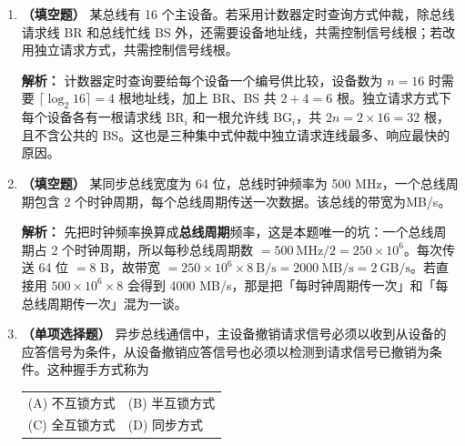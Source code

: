 \begin{enumerate}
\ifshowsolutions\par\noindent\textbf{解析：} 链式查询的 BG 信号像接力棒一样从仲裁器出发，按物理位置依次经过各设备，谁先接到谁先得到机会，因此优先级由\textbf{物理位置}固定，最近的最高。它只用 BR、BS、BG 三根线，代价是可靠性差：链路一断，后面的设备全部失联。(D) 描述的是\textbf{计数器定时查询}——那里才有一组设备地址线和可置初值的计数器，通过改变计数起点实现固定、循环或程序可控的优先级。链式查询没有计数器，无法用初值调优先级。\else \answerarea \fi

\item \textbf{（填空题）} 某总线有 16 个主设备。若采用计数器定时查询方式仲裁，除总线请求线 BR 和总线忙线 BS 外，还需要设备地址线，共需控制信号线\underline{\hspace{2cm}}根；若改用独立请求方式，共需控制信号线\underline{\hspace{2cm}}根。

\ifshowsolutions\par\noindent\textbf{解析：} 计数器定时查询要给每个设备一个编号供比较，设备数为 $n=16$ 时需要 $\lceil\log_2 16\rceil=4$ 根地址线，加上 BR、BS 共 $2+4=6$ 根。独立请求方式下每个设备各有一根请求线 BR$_i$ 和一根允许线 BG$_i$，共 $2n=2\times16=32$ 根，且不含公共的 BS。这也是三种集中式仲裁中独立请求连线最多、响应最快的原因。\else \answerarea \fi

\item \textbf{（填空题）} 某同步总线宽度为 64 位，总线时钟频率为 500 MHz，一个总线周期包含 2 个时钟周期，每个总线周期传送一次数据。该总线的带宽为\underline{\hspace{2cm}}MB/s。

\ifshowsolutions\par\noindent\textbf{解析：} 先把时钟频率换算成\textbf{总线周期}频率，这是本题唯一的坑：一个总线周期占 2 个时钟周期，所以每秒总线周期数 $=500\ \text{MHz}/2=250\times10^{6}$。每次传送 64 位 $=8$ B，故带宽 $=250\times10^{6}\times 8\ \text{B/s}=2000\ \text{MB/s}=2\ \text{GB/s}$。若直接用 $500\times10^{6}\times 8$ 会得到 4000 MB/s，那是把「每时钟周期传一次」和「每总线周期传一次」混为一谈。\else \answerarea \fi

\item \textbf{（单项选择题）} 异步总线通信中，主设备撤销请求信号必须以收到从设备的应答信号为条件，从设备撤销应答信号也必须以检测到请求信号已撤销为条件。这种握手方式称为

\nopagebreak[4]
\begin{center}
\begin{tabular}{ll}
(A) 不互锁方式 & (B) 半互锁方式 \\[4pt]
(C) 全互锁方式 & (D) 同步方式
\end{tabular}
\end{center}


\end{enumerate}
